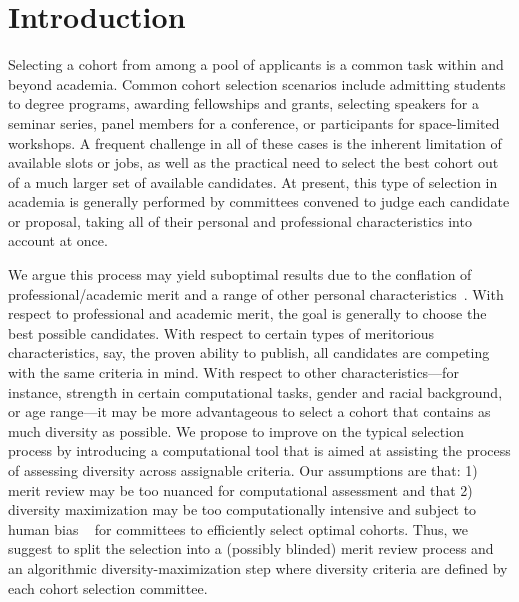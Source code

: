 \documentclass[10pt,letterpaper]{article}
\begin{document}
\linenumbers

\section*{\label{sec:introduction}Introduction}

Selecting a cohort from among a pool of applicants is a common task within and beyond academia. Common cohort selection scenarios include admitting students to degree programs, awarding fellowships and grants, selecting speakers for a seminar series, panel members for a conference, or participants for space-limited workshops. A frequent challenge in all of these cases is the inherent limitation of available slots or jobs, as well as the practical need to select the best cohort out of a much larger set of available candidates. At present, this type of selection in academia is generally performed by committees convened to judge each candidate or proposal, taking all of their personal and professional characteristics into account at once. 

We argue this process may yield suboptimal results due to the conflation of professional/academic merit and a range of other personal characteristics~\cite{bohnet2016}. With respect to professional and academic merit, the goal is generally to choose the best possible candidates. With respect to certain types of meritorious characteristics, say, the proven ability to publish, all candidates are competing with the same criteria in mind. With respect to other characteristics---for instance, strength in certain computational tasks, gender and racial background, or age range---it may be more advantageous to select a cohort that contains as much diversity as possible. We propose to improve on the typical selection process by introducing a computational tool that is aimed at assisting the process of assessing diversity across assignable criteria. Our assumptions are that: 1) merit review may be too nuanced for computational assessment and that 2) diversity maximization may be too computationally intensive and subject to human bias ~\cite{Greenwald1995} for committees to efficiently select optimal cohorts. Thus, we suggest to split the selection into a (possibly blinded) merit review process and an algorithmic diversity-maximization step where diversity criteria are defined by each cohort selection committee.
\end{document}
